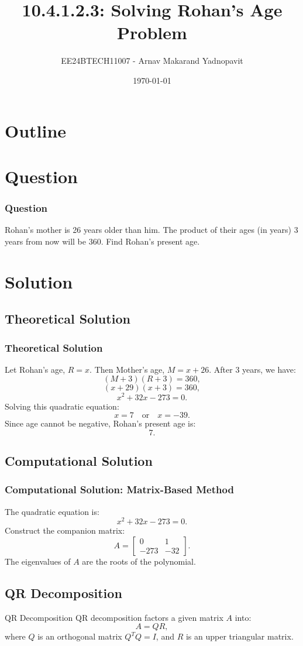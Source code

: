 \documentclass{beamer}
\title{10.4.1.2.3: Solving Rohan's Age Problem}
\author{EE24BTECH11007 - Arnav Makarand Yadnopavit}
\date{\today}
\numberwithin{equation}{section}
\begin{document}
\begin{frame}
\titlepage
\end{frame}

\section*{Outline}
\begin{frame}
\tableofcontents
\end{frame}

\section{Question}
\begin{frame}
\frametitle{Question}
Rohan's mother is 26 years older than him. The product of their ages (in years) 3 years from now will be 360. Find Rohan's present age.
\end{frame}

\section{Solution}
\subsection{Theoretical Solution}
\begin{frame}
\frametitle{Theoretical Solution}
Let Rohan's age, \( R = x \). Then Mother's age, \( M = x + 26 \). After 3 years, we have:
\[
(M + 3)(R + 3) = 360,
\]
\[
(x + 29)(x + 3) = 360,
\]
\[
x^2 + 32x - 273 = 0.
\]
Solving this quadratic equation:
\[
x = 7 \quad \text{or} \quad x = -39.
\]
Since age cannot be negative, Rohan's present age is:
\[
\boxed{7}.
\]
\end{frame}

\subsection{Computational Solution}
\begin{frame}
\frametitle{Computational Solution: Matrix-Based Method}
The quadratic equation is:
\[
x^2 + 32x - 273 = 0.
\]
Construct the companion matrix:
\[
A = \begin{bmatrix}
    0 & 1 \\
    -273 & -32
\end{bmatrix}.
\]
The eigenvalues of \( A \) are the roots of the polynomial.
\end{frame}

\subsection{QR Decomposition}
\begin{frame}{QR Decomposition}
QR decomposition factors a given matrix \( A \) into:
\[
A = QR,
\]
where \( Q \) is an orthogonal matrix \( Q^T Q = I \), and \( R \) is an upper triangular matrix.
\end{frame}
\end{document}
